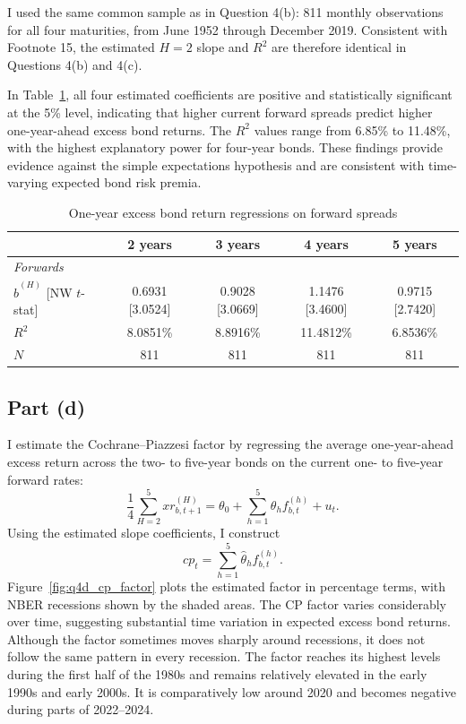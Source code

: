 \documentclass[11pt]{article}
\begin{document}
I used the same common sample as in Question 4(b): 811 monthly observations for all four maturities, from June 1952 through December 2019. Consistent with Footnote 15, the estimated $H=2$ slope and $R^2$ are therefore identical in Questions 4(b) and 4(c).

In Table~\ref{tab:q4c_forward_regressions}, all four estimated coefficients are positive and statistically significant at the 5\% level, indicating that higher current forward spreads predict higher one-year-ahead excess bond returns. 
The \(R^2\) values range from 6.85\% to 11.48\%, with the highest explanatory power for four-year bonds. 
These findings provide evidence against the simple expectations hypothesis and are consistent with time-varying expected bond risk premia.
\begin{table}[htbp]
    \centering
    \caption{One-year excess bond return regressions on forward spreads}
    \label{tab:q4c_forward_regressions}
    \begin{tabular}{lcccc}
        \toprule
        & 2 years & 3 years & 4 years & 5 years \\
        \midrule
        \multicolumn{5}{l}{\textit{Forwards}} \\
        $\widehat{b}^{(H)}$ [NW $t$-stat] & 0.6931 [3.0524] & 0.9028 [3.0669] & 1.1476 [3.4600] & 0.9715 [2.7420] \\
        $R^2$ & 8.0851\% & 8.8916\% & 11.4812\% & 6.8536\% \\
        $N$ & 811 & 811 & 811 & 811 \\
        \bottomrule
    \end{tabular}
\end{table}

\clearpage
\subsection{Part (d)}
I estimate the Cochrane–Piazzesi factor by regressing the average one-year-ahead excess return across the two- to five-year bonds on the current one- to five-year forward rates:
$$ \frac{1}{4}\sum_{H=2}^{5}xr_{b,t+1}^{(H)} = \theta_0+\sum_{h=1}^{5}\theta_h f_{b,t}^{(h)}+u_t. $$
Using the estimated slope coefficients, I construct
$$ cp_t=\sum_{h=1}^{5}\widehat{\theta}_h f_{b,t}^{(h)}. $$
Figure~\ref{fig:q4d_cp_factor} plots the estimated factor in percentage terms, with NBER recessions shown by the shaded areas. The CP factor varies considerably over time, suggesting substantial time variation in expected excess bond returns. 
Although the factor sometimes moves sharply around recessions, it does not follow the same pattern in every recession. The factor reaches its highest levels during the first half of the 1980s and remains relatively elevated in the early 1990s and early 2000s. 
It is comparatively low around 2020 and becomes negative during parts of 2022–2024.
\end{document}
